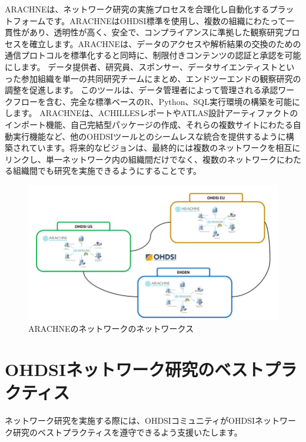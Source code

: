 \documentclass[
  11pt]{book}
\theoremstyle{definition}
\theoremstyle{definition}
\theoremstyle{definition}
\theoremstyle{definition}
\theoremstyle{remark}
\begin{document}
ARACHNEは、ネットワーク研究の実施プロセスを合理化し自動化するプラットフォームです。ARACHNEはOHDSI標準を使用し、複数の組織にわたって一貫性があり、透明性が高く、安全で、コンプライアンスに準拠した観察研究プロセスを確立します。ARACHNEは、データのアクセスや解析結果の交換のための通信プロトコルを標準化すると同時に、制限付きコンテンツの認証と承認を可能にします。 データ提供者、研究員、スポンサー、データサイエンティストといった参加組織を単一の共同研究チームにまとめ、エンドツーエンドの観察研究の調整を促進します。 このツールは、データ管理者によって管理される承認ワークフローを含む、完全な標準ベースのR、Python、SQL実行環境の構築を可能にします。 ARACHNEは、ACHILLESレポートやATLAS設計アーティファクトのインポート機能、自己完結型パッケージの作成、それらの複数サイトにわたる自動実行機能など、他のOHDSIツールとのシームレスな統合を提供するように構築されています。将来的なビジョンは、最終的には複数のネットワークを相互にリンクし、単一ネットワーク内の組織間だけでなく、複数のネットワークにわたる組織間でも研究を実施できるようにすることです。

\begin{figure}[h]

{\centering \includegraphics[width=0.9\linewidth]{images/NetworkStudies/ARACHNENON} 

}

\caption{ARACHNEのネットワークのネットワークス}\label{fig:arachneNon}
\end{figure}

\section{OHDSIネットワーク研究のベストプラクティス}\label{ohdsiux30cdux30c3ux30c8ux30efux30fcux30afux7814ux7a76ux306eux30d9ux30b9ux30c8ux30d7ux30e9ux30afux30c6ux30a3ux30b9}


ネットワーク研究を実施する際には、OHDSIコミュニティがOHDSIネットワーク研究のベストプラクティスを遵守できるよう支援いたします。
\end{document}
